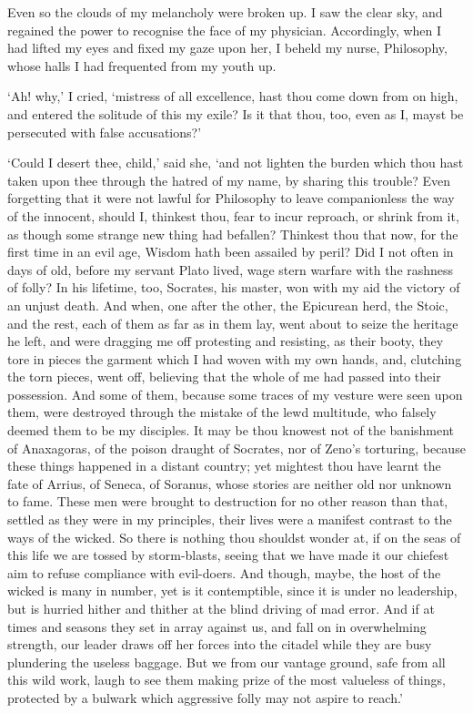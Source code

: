 \documentclass[11pt]{book}
\begin{document}
Even so the clouds of my melancholy were broken up. I saw the clear sky,
and regained the power to recognise the face of my physician.
Accordingly, when I had lifted my eyes and fixed my gaze upon her, I
beheld my nurse, Philosophy, whose halls I had frequented from my youth
up.

`Ah! why,' I cried, `mistress of all excellence, hast thou come down
from on high, and entered the solitude of this my exile? Is it that
thou, too, even as I, mayst be persecuted with false accusations?'

`Could I desert thee, child,' said she, `and not lighten the burden  
which thou hast taken upon thee through the hatred of my name, by       
sharing this trouble? Even forgetting that it were not lawful for       
Philosophy to leave companionless the way of the innocent, should I,    
thinkest thou, fear to incur reproach, or shrink from it, as though     
some strange new thing had befallen? Thinkest thou that now, for        
the first time in an evil age, Wisdom hath been assailed by peril?      
Did I not often in days of old, before my servant Plato lived, wage     
stern warfare with the rashness of folly? In his lifetime, too,         
Socrates, his master, won with my aid the victory of an unjust death.   
\label{otherPhilosophies}And when, one after the other, the Epicurean   
herd, the Stoic, and the rest, each of them as far as in them lay,      
went about to seize the heritage he left, and were dragging me off      
protesting and resisting, as their booty, they tore in pieces the       
garment which I had woven with my own hands, and, clutching the torn    
pieces, went off, believing that the whole of me had passed into        
their possession. And some of them, because some traces of my vesture   
were seen upon them, were destroyed through the mistake of the lewd     
multitude, who falsely deemed them to be my disciples. It may be thou   
knowest not of the banishment of Anaxagoras, of the poison draught of   
Socrates, nor of Zeno's torturing, because these things happened in a   
distant country; yet mightest thou have learnt the fate of Arrius, of   
Seneca, of Soranus, whose stories are neither old nor unknown to fame.  
These men were brought to destruction for no other reason than that,    
settled as they were in my principles, their lives were a manifest      
contrast to the ways of the wicked. So there is nothing thou shouldst   
wonder at, if on the seas of this life we are tossed by storm-blasts,   
seeing that we have made it our chiefest aim to refuse compliance       
with evil-doers. And though, maybe, the host of the wicked is many in   
number, yet is it contemptible, since it is under no leadership, but    
is hurried hither and thither at the blind driving of mad error. And    
if at times and seasons they set in array against us, and fall on in    
overwhelming strength, our leader draws off her forces into the citadel 
while they are busy plundering the useless baggage. But we from our     
vantage ground, safe from all this wild work, laugh to see them making  
prize of the most valueless of things, protected by a bulwark which     
aggressive folly may not aspire to reach.'                              
\end{document}
